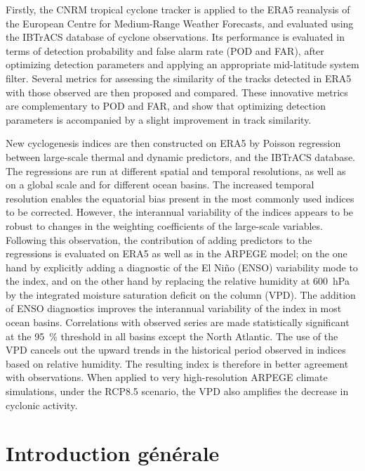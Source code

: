 \documentclass[12pt,twoside,openright]{book}
\newcommand{\hPa}[1]{\SI{#1}{\hecto\pascal}}
\newcommand{\prct}[1]{\SI{#1}{\percent}}
\begin{document}
Firstly, the CNRM tropical cyclone tracker is applied to the ERA5 reanalysis of the European Centre for Medium-Range Weather Forecasts, and evaluated using the
IBTrACS database of cyclone observations. Its performance is evaluated in terms of detection probability and false alarm rate (POD and FAR), after optimizing
detection parameters and applying an appropriate mid-latitude system filter. Several metrics for assessing the similarity of the tracks detected in ERA5 with
those observed are then proposed and compared. These innovative metrics are complementary to POD and FAR, and show that optimizing detection parameters is
accompanied by a slight improvement in track similarity.

New cyclogenesis indices are then constructed on ERA5 by Poisson regression between large-scale thermal and dynamic predictors, and the IBTrACS database. The
regressions are run at different spatial and temporal resolutions, as well as on a global scale and for different ocean basins. The increased temporal
resolution enables the equatorial bias present in the most commonly used indices to be corrected. However, the interannual variability of the indices appears to
be robust to changes in the weighting coefficients of the large-scale variables. Following this observation, the contribution of adding predictors to the
regressions is evaluated on ERA5 as well as in the ARPEGE model; on the one hand by explicitly adding a diagnostic of the El Niño (ENSO) variability mode to the
index, and on the other hand by replacing the relative humidity at \hPa{600} by the integrated moisture saturation deficit on the column (VPD). The addition of
ENSO diagnostics improves the interannual variability of the index in most ocean basins. Correlations with observed series are made statistically significant at
the \prct{95} threshold in all basins except the North Atlantic. The use of the VPD cancels out the upward trends in the historical period observed in indices
based on relative humidity. The resulting index is therefore in better agreement with observations. When applied to very high-resolution ARPEGE climate
simulations, under the RCP8.5 scenario, the VPD also amplifies the decrease in cyclonic activity.

\tableofcontents
\mainmatter

\chapter*{Introduction générale}
\end{document}

